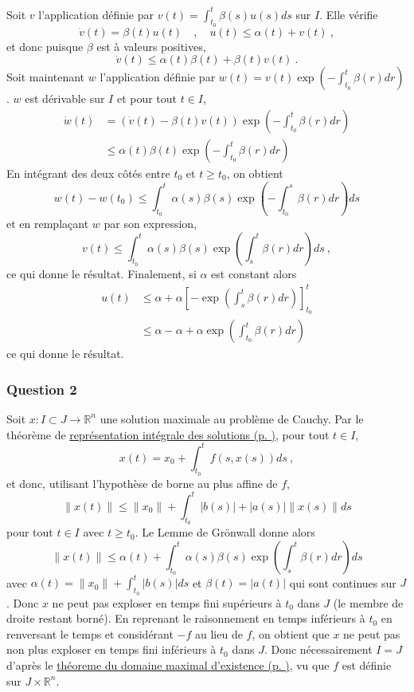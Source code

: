 
Soit \(v\) l'application définie par \(v(t)=\int_{t_0}^t\beta(s)u(s)ds\)
sur \(I\). Elle vérifie \[
\dot{v}(t) = \beta(t)u(t) \quad , \quad u(t) \leq \alpha(t)+v(t) \ ,
\] et donc puisque \(\beta\) est à valeurs positives, \[
\dot{v}(t) \leq \alpha(t)\beta(t)+\beta(t)v(t) \ .
\] Soit maintenant \(w\) l'application définie par
\(w(t)=v(t)\exp\left(-\int_{t_0}^t\beta(r)dr\right)\). \(w\) est
dérivable sur \(I\) et pour tout \(t\in I\), \begin{align*}
\dot{w}(t) &= (\dot{v}(t)-\beta(t)v(t))\exp\left(-\int_{t_0}^t\beta(r)dr\right)\\
&\leq \alpha(t)\beta(t)\exp\left(-\int_{t_0}^t\beta(r)dr\right)
\end{align*} En intégrant des deux côtés entre \(t_0\) et \(t\geq t_0\),
on obtient \[
w(t)-w(t_0)\leq \int_{t_0}^t \alpha(s)\beta(s)\exp\left(-\int_{t_0}^s\beta(r)dr\right)ds
\] et en remplaçant \(w\) par son expression, \[
v(t)\leq \int_{t_0}^t \alpha(s)\beta(s)\exp\left(\int_{s}^t\beta(r)dr\right)ds \ ,
\] ce qui donne le résultat. Finalement, si \(\alpha\) est constant
alors \begin{align*}
u(t) &\leq \alpha +\alpha \left[-\exp\left(\int_s^t\beta(r)dr \right) \right]_{t_0}^t \\
& \leq \alpha -\alpha +\alpha \exp\left(\int_{t_0}^t\beta(r)dr \right)
\end{align*} ce qui donne le résultat.

\hypertarget{answer-gro-2}{%
\subsubsection*{Question 2}\label{answer-gro-2}}


Soit \(x:I\subset J\to \mathbb{R}^n\) une solution maximale au problème
de Cauchy. Par le théorème de
\protect\hyperlink{theo_eq_integrale}{représentation intégrale des
solutions (p. \pageref*{theo_eq_integrale})}, pour tout \(t\in I\), \[
x(t)=x_0 + \int_{t_0}^t f(s,x(s))ds \ ,
\] et donc, utilisant l'hypothèse de borne au plus affine de \(f\), \[
\|x(t)\| \leq \|x_0\| + \int_{t_0}^t |b(s)| + |a(s)|\|x(s)\|ds 
\] pour tout \(t\in I\) avec \(t\geq t_0\). Le Lemme de Grönwall donne
alors \[
\|x(t)\| \leq \alpha(t) +  \int_{t_0}^{t} \alpha(s)\beta(s) \exp\left(\int_{s}^t\beta(r)dr \right) ds
\] avec \(\alpha(t)=\|x_0\| + \int_{t_0}^t |b(s)| ds\) et
\(\beta(t)= |a(t)|\) qui sont continues sur \(J\). Donc \(x\) ne peut
pas exploser en temps fini supérieurs à \(t_0\) dans \(J\) (le membre de
droite restant borné). En reprenant le raisonnement en temps inférieurs
à \(t_0\) en renversant le temps et considérant \(-f\) au lieu de \(f\),
on obtient que \(x\) ne peut pas non plus exploser en temps fini
inférieurs à \(t_0\) dans \(J\). Donc nécessairement \(I=J\) d'après le
\protect\hyperlink{theo_bouts}{théoreme du domaine maximal d'existence
(p. \pageref*{theo_bouts})}, vu que \(f\) est définie sur
\(J\times\mathbb{R}^n\).

